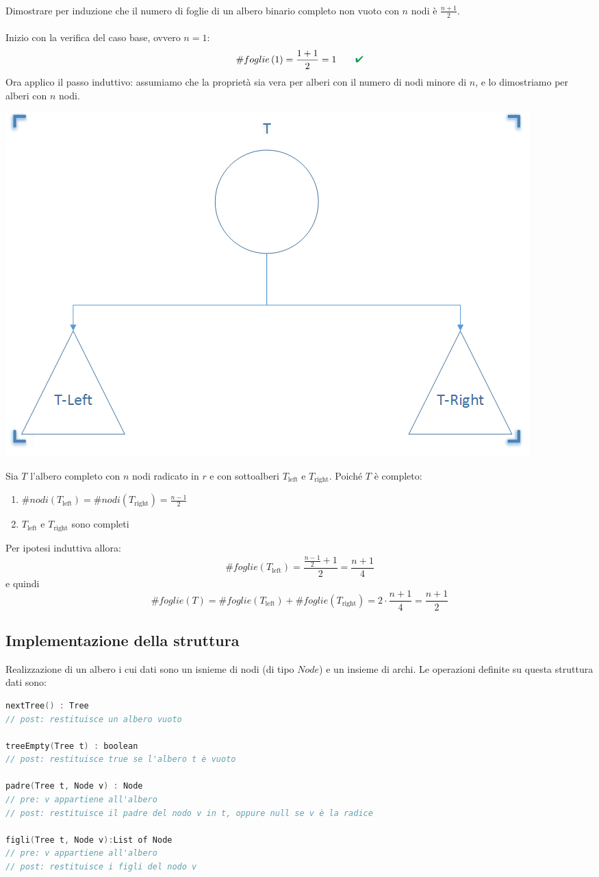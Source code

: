 \documentclass[italian]{article}
\renewcommand{\checkmark}{\textcolor{ForestGreen}{\text{\ding{52}}}}
\newcommand{\dateright}[1]{\normalfont{\normalsize{\hfill #1 \\}}}
\newcommand{\leaves}[1]{\text{$\#foglie\left(#1\right)$}}
\newcommand{\nodes}[1]{\text{$\#nodi\left(#1\right)$}}
\newcommand{\exercize}{\text{\faPencil $\;$ Esercizio }}
\begin{document}
\subsubsection{\exercize}
Dimostrare per induzione che il numero di foglie di un albero binario completo non vuoto con $n$ nodi è $\frac{n+1}{2}$.\\\\
Inizio con la verifica del caso base, ovvero $n=1$:
\[
	\leaves{1} = \dfrac{1+1}{2} = 1 \qquad \checkmark
\]
Ora applico il passo induttivo: assumiamo che la proprietà sia vera per alberi con il numero di nodi minore di $n$, e lo dimostriamo per alberi con $n$ nodi.
\begin{center}
	\includegraphics[width=0.5\linewidth]{"images/albero_trl"}
\end{center}
Sia $T$ l'albero completo con $n$ nodi radicato in $r$ e con sottoalberi $T_{\text{left}}$ e $T_{\text{right}}$. Poiché $T$ è completo:
\begin{enumerate}
	\item $\nodes{T_{\text{left}}} = \nodes{T_{\text{right}}} = \frac{n-1}{2}$
	\item  $T_{\text{left}}$ e $T_{\text{right}}$ sono completi
\end{enumerate}
Per ipotesi induttiva allora:
\[
	\leaves{T_{\text{left}}} = \dfrac{\frac{n-1}{2}+1}{2} = \frac{n+1}{4}
\]
e quindi
\[
	\leaves{T} = \leaves{T_{\text{left}}} + \leaves{T_{\text{right}}}= 2\cdot \frac{n+1}{4} = \frac{n+1}{2}
\]
\pagebreak
\subsection{Implementazione della struttura}
\dateright{16 Novembre 2016}
Realizzazione di un albero i cui dati sono un isnieme di nodi (di tipo $Node$) e un insieme di archi. Le operazioni definite su questa struttura dati sono:
\begin{lstlisting}[language=c,mathescape=true]
nextTree() : Tree
// post: restituisce un albero vuoto

treeEmpty(Tree t) : boolean
// post: restituisce true se l'albero t è vuoto

padre(Tree t, Node v) : Node
// pre: v appartiene all'albero
// post: restituisce il padre del nodo v in t, oppure null se v è la radice

figli(Tree t, Node v):List of Node
// pre: v appartiene all'albero
// post: restituisce i figli del nodo v
\end{lstlisting}
\end{document}
